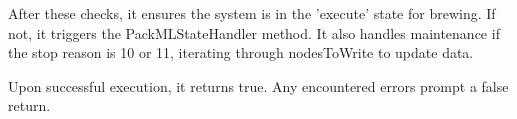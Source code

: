 After these checks, it ensures the system is in the 'execute' state for brewing. If not, it triggers the PackMLStateHandler method. It also handles maintenance if the stop reason is 10 or 11, iterating through nodesToWrite to update data.\newline

Upon successful execution, it returns true. Any encountered errors prompt a false return.\newline